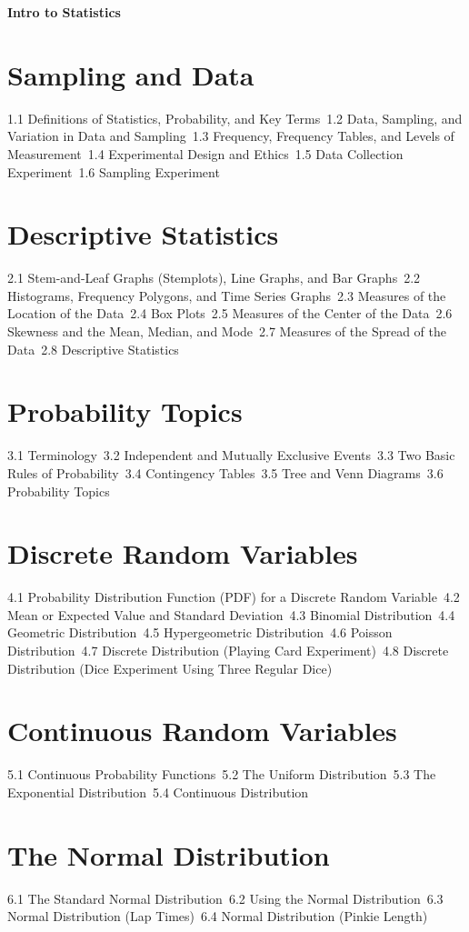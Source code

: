 {\LARGE \bf{Intro to Statistics}}
\section{Sampling and Data}
1.1 Definitions of Statistics, Probability, and Key Terms\
1.2 Data, Sampling, and Variation in Data and Sampling\
1.3 Frequency, Frequency Tables, and Levels of Measurement\
1.4 Experimental Design and Ethics\
1.5 Data Collection Experiment\
1.6 Sampling Experiment\
\section{Descriptive Statistics}
2.1 Stem-and-Leaf Graphs (Stemplots), Line Graphs, and Bar Graphs\
2.2 Histograms, Frequency Polygons, and Time Series Graphs\
2.3 Measures of the Location of the Data\
2.4 Box Plots\
2.5 Measures of the Center of the Data\
2.6 Skewness and the Mean, Median, and Mode\
2.7 Measures of the Spread of the Data\
2.8 Descriptive Statistics\
\section{Probability Topics}
3.1 Terminology\
3.2 Independent and Mutually Exclusive Events\
3.3 Two Basic Rules of Probability\
3.4 Contingency Tables\
3.5 Tree and Venn Diagrams\
3.6 Probability Topics\
\section{Discrete Random Variables}
4.1 Probability Distribution Function (PDF) for a Discrete Random Variable\
4.2 Mean or Expected Value and Standard Deviation\
4.3 Binomial Distribution\
4.4 Geometric Distribution\
4.5 Hypergeometric Distribution\
4.6 Poisson Distribution\
4.7 Discrete Distribution (Playing Card Experiment)\
4.8 Discrete Distribution (Dice Experiment Using Three Regular Dice)\
\section{Continuous Random Variables}
5.1 Continuous Probability Functions\
5.2 The Uniform Distribution\
5.3 The Exponential Distribution\
5.4 Continuous Distribution\
\section{The Normal Distribution}
6.1 The Standard Normal Distribution\
6.2 Using the Normal Distribution\
6.3 Normal Distribution (Lap Times)\
6.4 Normal Distribution (Pinkie Length)\
